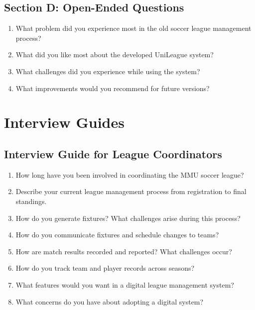 \documentclass[12pt,a4paper]{report}
\begin{document}
\section*{Section D: Open-Ended Questions}
\begin{enumerate}
  \item What problem did you experience most in the old soccer league management process?\\[1.2cm]
  \item What did you like most about the developed UniLeague system?\\[1.2cm]
  \item What challenges did you experience while using the system?\\[1.2cm]
  \item What improvements would you recommend for future versions?\\[1.2cm]
\end{enumerate}

\chapter{Interview Guides}

\section*{Interview Guide for League Coordinators}
\begin{enumerate}
  \item How long have you been involved in coordinating the MMU soccer league?
  \item Describe your current league management process from registration to final standings.
  \item How do you generate fixtures? What challenges arise during this process?
  \item How do you communicate fixtures and schedule changes to teams?
  \item How are match results recorded and reported? What challenges occur?
  \item How do you track team and player records across seasons?
  \item What features would you want in a digital league management system?
  \item What concerns do you have about adopting a digital system?
\end{enumerate}
\end{document}

